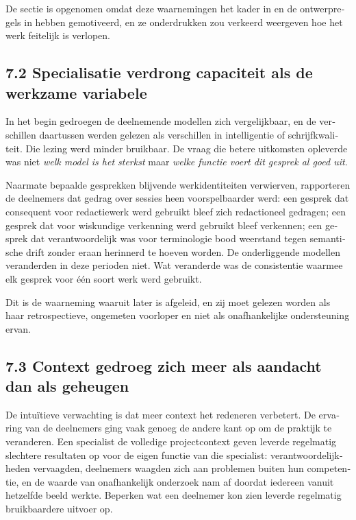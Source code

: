 \begin{dutch}
De sectie is opgenomen omdat deze waarnemingen het kader in  en de ontwerpregels in  hebben gemotiveerd, en ze onderdrukken zou verkeerd weergeven hoe het werk feitelijk is verlopen.


\subsection*{7.2 Specialisatie verdrong capaciteit als de werkzame variabele}
\label{sec:nl:7.2}

In het begin gedroegen de deelnemende modellen zich vergelijkbaar, en de verschillen daartussen werden gelezen als verschillen in intelligentie of schrijfkwaliteit. Die lezing werd minder bruikbaar. De vraag die betere uitkomsten opleverde was niet \emph{welk model is het sterkst} maar \emph{welke functie voert dit gesprek al goed uit}.

Naarmate bepaalde gesprekken blijvende werkidentiteiten verwierven, rapporteren de deelnemers dat gedrag over sessies heen voorspelbaarder werd: een gesprek dat consequent voor redactiewerk werd gebruikt bleef zich redactioneel gedragen; een gesprek dat voor wiskundige verkenning werd gebruikt bleef verkennen; een gesprek dat verantwoordelijk was voor terminologie bood weerstand tegen semantische drift zonder eraan herinnerd te hoeven worden. De onderliggende modellen veranderden in deze perioden niet. Wat veranderde was de consistentie waarmee elk gesprek voor één soort werk werd gebruikt.

Dit is de waarneming waaruit  later is afgeleid, en zij moet gelezen worden als haar retrospectieve, ongemeten voorloper en niet als onafhankelijke ondersteuning ervan.


\subsection*{7.3 Context gedroeg zich meer als aandacht dan als geheugen}
\label{sec:nl:7.3}

De intuïtieve verwachting is dat meer context het redeneren verbetert. De ervaring van de deelnemers ging vaak genoeg de andere kant op om de praktijk te veranderen. Een specialist de volledige projectcontext geven leverde regelmatig slechtere resultaten op voor de eigen functie van die specialist: verantwoordelijkheden vervaagden, deelnemers waagden zich aan problemen buiten hun competentie, en de waarde van onafhankelijk onderzoek nam af doordat iedereen vanuit hetzelfde beeld werkte. Beperken wat een deelnemer kon zien leverde regelmatig bruikbaardere uitvoer op.


\end{dutch}
